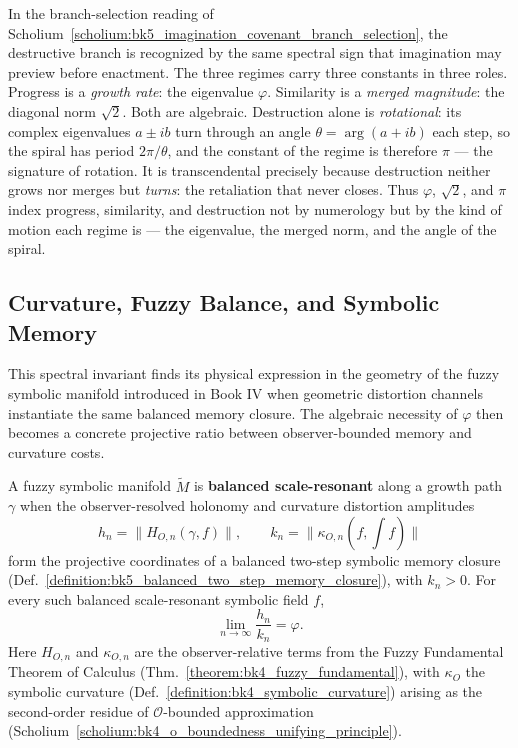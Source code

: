 \begin{scholium}
\label{scholium:bk5_pi_at_mad_edge}
In the branch-selection reading of Scholium~\ref{scholium:bk5_imagination_covenant_branch_selection}, the destructive branch is recognized by the same spectral sign that imagination may preview before enactment. The three regimes carry three constants in three roles. Progress is a \emph{growth rate}: the eigenvalue $\varphi$. Similarity is a \emph{merged magnitude}: the diagonal norm $\sqrt2$. Both are algebraic. Destruction alone is \emph{rotational}: its complex eigenvalues $a\pm ib$ turn through an angle $\theta=\arg(a+ib)$ each step, so the spiral has period $2\pi/\theta$, and the constant of the regime is therefore $\pi$ --- the signature of rotation. It is transcendental precisely because destruction neither grows nor merges but \emph{turns}: the retaliation that never closes. Thus $\varphi$, $\sqrt2$, and $\pi$ index progress, similarity, and destruction not by numerology but by the kind of motion each regime is --- the eigenvalue, the merged norm, and the angle of the spiral.
\end{scholium}

\subsection{Curvature, Fuzzy Balance, and Symbolic Memory}
\label{subsec:bk5_curvature_and_fuzzy_balance}

This spectral invariant finds its physical expression in the geometry of the fuzzy symbolic manifold introduced in Book IV when geometric distortion channels instantiate the same balanced memory closure. The algebraic necessity of $\varphi$ then becomes a concrete projective ratio between observer-bounded memory and curvature costs.

\begin{theorem}
\label{theorem:bk5_golden_ratio_curvature_scalar}
A fuzzy symbolic manifold $\tilde{M}$ is \textbf{balanced scale-resonant} along
a growth path $\gamma$ when the observer-resolved holonomy and curvature
distortion amplitudes
\[
h_n=\|H_{O,n}(\gamma,f)\|,\qquad
k_n=\|\kappa_{O,n}(f,\int f)\|
\]
form the projective coordinates of a balanced two-step symbolic memory closure
(Def.~\ref{definition:bk5_balanced_two_step_memory_closure}), with $k_n>0$.
For every such balanced scale-resonant symbolic field $f$,
\[
\lim_{n\to\infty}\frac{h_n}{k_n}=\varphi.
\]
Here $H_{O,n}$ and $\kappa_{O,n}$ are the observer-relative terms from the Fuzzy
Fundamental Theorem of Calculus (Thm.~\ref{theorem:bk4_fuzzy_fundamental}), with
$\kappa_O$ the symbolic curvature (Def.~\ref{definition:bk4_symbolic_curvature})
arising as the second-order residue of $\mathcal{O}$-bounded approximation
(Scholium~\ref{scholium:bk4_o_boundedness_unifying_principle}).
\end{theorem}

